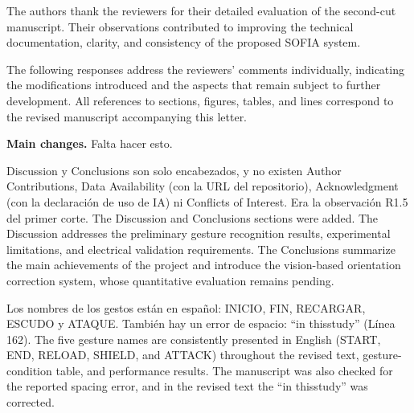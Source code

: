 \documentclass{LabDSTresponse}
\begin{document}
	
	
	The authors thank the reviewers for their
	detailed evaluation of the second-cut
	manuscript. Their observations contributed
	to improving the technical documentation,
	clarity, and consistency of the proposed
	SOFIA system.
	
	The following responses address the
	reviewers' comments individually, indicating
	the modifications introduced and the aspects
	that remain subject to further development.
	All references to sections, figures, tables,
	and lines correspond to the revised manuscript
	accompanying this letter.
	
	\textbf{Main changes.} Falta hacer esto.
	
	\LabDSTsummary
	
	
	{Discussion y Conclusions son solo encabezados, y no existen Author Contributions, Data Availability (con la URL del
		repositorio), Acknowledgment (con la declaración de uso de IA) ni Conflicts of Interest. Era la observación R1.5 del primer
		corte.}
	{The Discussion and Conclusions sections were added.
	The Discussion addresses the preliminary gesture recognition
	results, experimental limitations, and electrical validation
	requirements. The Conclusions summarize the main achievements
	of the project and introduce the vision-based orientation
	correction system, whose quantitative evaluation remains
	pending.}
	
	{Los nombres de los gestos están en español: INICIO, FIN,
		RECARGAR, ESCUDO y ATAQUE. También hay un error de
		espacio: ``in thisstudy'' (Línea 162).}
	{The five gesture names are consistently presented in
		English (START, END, RELOAD, SHIELD, and ATTACK)
		throughout the revised text, gesture-condition table,
		and performance results. The manuscript was also
		checked for the reported spacing error, and in the revised text the ``in thisstudy'' was corrected.}
	
\end{document}
